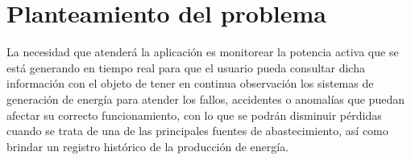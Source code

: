 
\section{Planteamiento del problema}

La necesidad que atenderá la aplicación es monitorear la potencia activa que se está generando en tiempo real para que el usuario pueda consultar dicha información con el objeto de tener en continua observación los sistemas de generación de energía para atender los fallos, accidentes o anomalías que puedan afectar su correcto funcionamiento, con lo que se podrán disminuir pérdidas cuando se trata de una de las principales fuentes de abastecimiento, así como brindar un registro histórico de la producción de energía.

